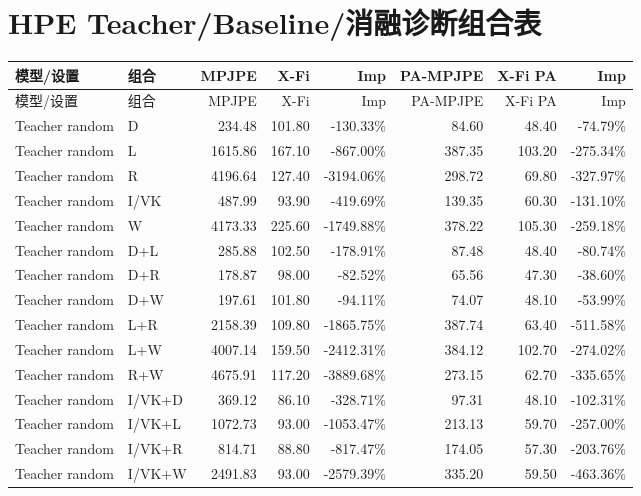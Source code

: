 \documentclass[UTF8,10pt]{ctexart}
\newcommand{\worse}[1]{\textcolor{badred}{#1}}
\begin{document}
\section{HPE Teacher/Baseline/消融诊断组合表}
{\tiny
\begin{longtable}{llrrrrrr}
\toprule
模型/设置 & 组合 & MPJPE & X-Fi & Imp & PA-MPJPE & X-Fi PA & Imp\\
\midrule
\endfirsthead
\toprule
模型/设置 & 组合 & MPJPE & X-Fi & Imp & PA-MPJPE & X-Fi PA & Imp\\
\midrule
\endhead
Teacher random & D & 234.48 & 101.80 & \worse{-130.33\%} & 84.60 & 48.40 & \worse{-74.79\%}\\
Teacher random & L & 1615.86 & 167.10 & \worse{-867.00\%} & 387.35 & 103.20 & \worse{-275.34\%}\\
Teacher random & R & 4196.64 & 127.40 & \worse{-3194.06\%} & 298.72 & 69.80 & \worse{-327.97\%}\\
Teacher random & I/VK & 487.99 & 93.90 & \worse{-419.69\%} & 139.35 & 60.30 & \worse{-131.10\%}\\
Teacher random & W & 4173.33 & 225.60 & \worse{-1749.88\%} & 378.22 & 105.30 & \worse{-259.18\%}\\
Teacher random & D+L & 285.88 & 102.50 & \worse{-178.91\%} & 87.48 & 48.40 & \worse{-80.74\%}\\
Teacher random & D+R & 178.87 & 98.00 & \worse{-82.52\%} & 65.56 & 47.30 & \worse{-38.60\%}\\
Teacher random & D+W & 197.61 & 101.80 & \worse{-94.11\%} & 74.07 & 48.10 & \worse{-53.99\%}\\
Teacher random & L+R & 2158.39 & 109.80 & \worse{-1865.75\%} & 387.74 & 63.40 & \worse{-511.58\%}\\
Teacher random & L+W & 4007.14 & 159.50 & \worse{-2412.31\%} & 384.12 & 102.70 & \worse{-274.02\%}\\
Teacher random & R+W & 4675.91 & 117.20 & \worse{-3889.68\%} & 273.15 & 62.70 & \worse{-335.65\%}\\
Teacher random & I/VK+D & 369.12 & 86.10 & \worse{-328.71\%} & 97.31 & 48.10 & \worse{-102.31\%}\\
Teacher random & I/VK+L & 1072.73 & 93.00 & \worse{-1053.47\%} & 213.13 & 59.70 & \worse{-257.00\%}\\
Teacher random & I/VK+R & 814.71 & 88.80 & \worse{-817.47\%} & 174.05 & 57.30 & \worse{-203.76\%}\\
Teacher random & I/VK+W & 2491.83 & 93.00 & \worse{-2579.39\%} & 335.20 & 59.50 & \worse{-463.36\%}\\

\end{longtable}}
\end{document}
